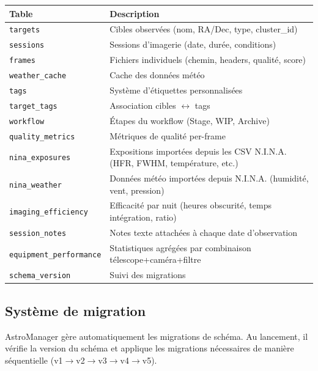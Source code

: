 \documentclass[a4paper,11pt]{article}
\begin{document}
\begin{center}
\begin{tabularx}{\textwidth}{l X}
\toprule
\textbf{Table} & \textbf{Description} \\
\midrule
\texttt{targets} & Cibles observ\'{e}es (nom, RA/Dec, type, cluster\_id) \\
\texttt{sessions} & Sessions d'imagerie (date, dur\'{e}e, conditions) \\
\texttt{frames} & Fichiers individuels (chemin, headers, qualit\'{e}, score) \\
\texttt{weather\_cache} & Cache des donn\'{e}es m\'{e}t\'{e}o \\
\texttt{tags} & Syst\`{e}me d'\'{e}tiquettes personnalis\'{e}es \\
\texttt{target\_tags} & Association cibles $\leftrightarrow$ tags \\
\texttt{workflow} & \'{E}tapes du workflow (Stage, WIP, Archive) \\
\texttt{quality\_metrics} & M\'{e}triques de qualit\'{e} per-frame \\
\texttt{nina\_exposures} & Expositions import\'{e}es depuis les CSV N.I.N.A. (HFR, FWHM, temp\'{e}rature, etc.) \\
\texttt{nina\_weather} & Donn\'{e}es m\'{e}t\'{e}o import\'{e}es depuis N.I.N.A. (humidit\'{e}, vent, pression) \\
\texttt{imaging\_efficiency} & Efficacit\'{e} par nuit (heures obscurit\'{e}, temps int\'{e}gration, ratio) \\
\texttt{session\_notes} & Notes texte attach\'{e}es \`{a} chaque date d'observation \\
\texttt{equipment\_performance} & Statistiques agr\'{e}g\'{e}es par combinaison t\'{e}lescope+cam\'{e}ra+filtre \\
\texttt{schema\_version} & Suivi des migrations \\
\bottomrule
\end{tabularx}
\end{center}

\subsection{Syst\`{e}me de migration}

AstroManager g\`{e}re automatiquement les migrations de sch\'{e}ma. Au lancement, il v\'{e}rifie la version du sch\'{e}ma et applique les migrations n\'{e}cessaires de mani\`{e}re s\'{e}quentielle (v1$\rightarrow$v2$\rightarrow$v3$\rightarrow$v4$\rightarrow$v5).
\end{document}
